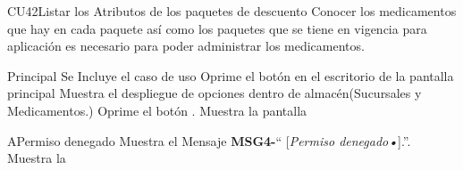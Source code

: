 \begin{UseCase}{CU42}{Listar los Atributos de los paquetes de descuento}{
Conocer los medicamentos que hay en cada paquete así como los paquetes que se tiene en vigencia para aplicación es necesario para poder administrar los medicamentos.
	}
	\end{UseCase}
	\begin{UCtrayectoria}{Principal}
		\UCpaso Se Incluye el caso de uso 
		\UCpaso [\UCactor] Oprime el botón  en el escritorio de la pantalla principal  
		\UCpaso Muestra el despliegue de opciones dentro de almacén(Sucursales y Medicamentos.)
		\UCpaso [\Ucactor] Oprime el botón .
		\UCpaso Muestra la pantalla 
	\end{UCtrayectoria}

\begin{UCtrayectoriaA}{A}{Permiso denegado}
\UCpaso Muestra el Mensaje {\bf MSG4-}`` [{\em Permiso denegado\textsl{•}}].''.
			\UCpaso Muestra la 
\end{UCtrayectoriaA}
